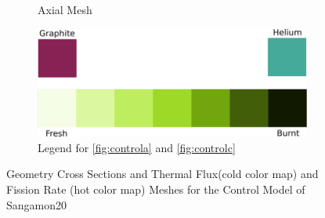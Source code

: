 \begin{figure}[H]
\begin{subfigure}{0.45\textwidth}
  \caption{Axial Mesh}
  \label{fig:controld}
\end{subfigure}
%
\begin{subfigure}{\textwidth}
\centering
\includegraphics[width=0.6\linewidth]{figures/geom-legend}
\caption{Legend for \ref{fig:controla} and \ref{fig:controlc}}
\label{fig:geom-legend}
\end{subfigure}

\caption{Geometry Cross Sections and Thermal Flux(cold color map) and Fission Rate (hot color map) Meshes for the Control Model of Sangamon20}
\label{fig:controlmain}
\end{figure}